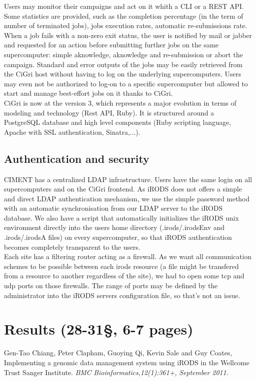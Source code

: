 \documentclass[a4paper, 10pt]{article}
\begin{document}
\begin{multicols}{2}

Users may monitor their campaigns and act on it whith a CLI or a REST API. Some statistics are provided, such as the completion percentage (in the term of number of terminated jobs), jobs execution rates, automatic re-submissions rate. When a job fails with a non-zero exit status, the user is notified by mail or jabber and requested for an action before submitting further jobs on the same supercomputer: simple aknowledge, aknowledge and re-submission or abort the campaign. Standard and error outputs of the jobs may be easily retrieved from the CiGri host without having to log on the underlying supercomputers. Users may even not be authorized to log-on to a specific supercomputer but allowed to start and manage best-effort jobs on it thanks to CiGri.
\\
CiGri is now at the version 3, which represents a major evolution in terms of modeling and technology (Rest API, Ruby). It is structured around a PostgreSQL database and high level components (Ruby scripting language, Apache with SSL authentication, Sinatra,...).

\newpage

\subsection{Authentication and security}

CIMENT has a centralized LDAP infrastructure. Users have the same login on all supercomputers and on the CiGri frontend. As iRODS does not offers a simple and direct LDAP authentication mechanism, we use the simple password method with an automatic synchronisation from our LDAP server to the iRODS database. We also have a script that automatically initializes the iRODS unix environment directly into the users home directory (.irods/.irodsEnv and .irods/.irodsA files) on every supercomputer, so that iRODS authentication becomes completely transparent to the users.
\\
Each site has a filtering router acting as a firewall. As we want all communication schemes to be possible between each irods resource (a file might be transfered from a resource to another regardless of the site), we had to open some tcp and udp ports on those firewalls. The range of ports may be defined by the administrator into the iRODS servers configuration file, so that's not an issue.


\section{Results (28-31\S, 6-7 pages)}


\begin{thebibliography}{9}
 Gen-Tao Chiang, Peter Clapham, Guoying Qi, Kevin Sale and Guy Coates,
 Implementing a genomic data management system using iRODS in the Wellcome Trust Sanger Institute.
{\em BMC Bioinformatics,12(1):361+, September 2011.}
\end{thebibliography}

\end{multicols}
\end{document}

